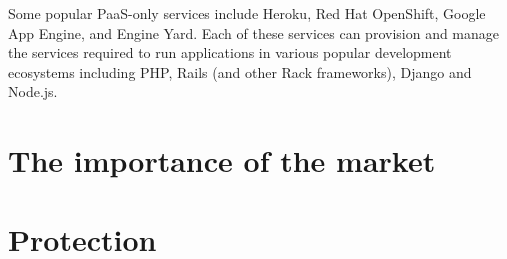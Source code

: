 \documentclass[a4paper]{proc}
\begin{document}
  Some popular PaaS-only services include Heroku, Red Hat OpenShift, Google App Engine, and Engine Yard. Each of these services can provision and manage the services required to run applications in various popular development ecosystems including PHP, Rails (and other Rack frameworks), Django and Node.js.




  \section{The importance of the market}
  \label{sec:market}


  \section{Protection}
  \label{sec:protection}


\end{document}
